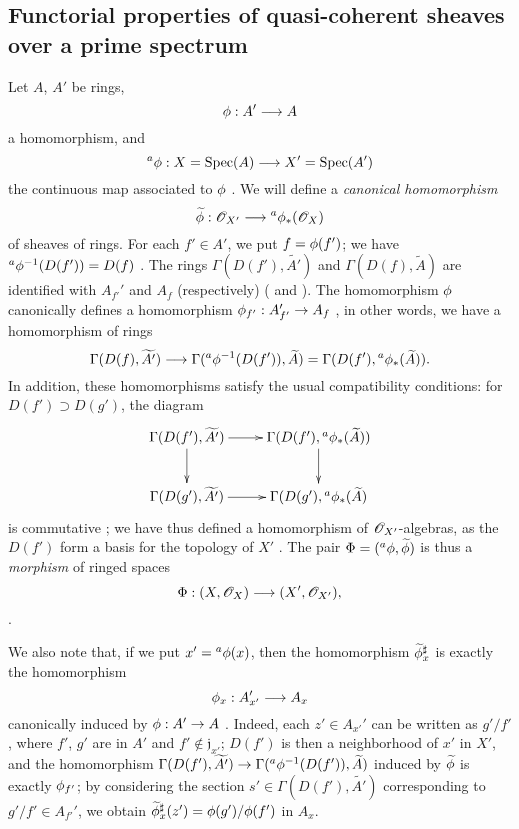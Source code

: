 \subsection{Functorial properties of quasi-coherent sheaves over a prime spectrum}
\label{subsection:I.1.6}

\begin{env}[1.6.1]
\label{I.1.6.1}
Let $A$, $A'$ be rings,
\[
  \vphi:A'\to A
\]
a homomorphism, and
\[
  {}^a\vphi:X=\Spec(A)\to X'=\Spec(A')
\]
the continuous map associated to $\phi$ .
We will define a \emph{canonical homomorphism}
\[
  \widetilde{\vphi}:\sh{O}_{X'}\to{}^a\vphi_*(\sh{O}_X)
\]
of sheaves of rings.
For each $f'\in A'$, we put $f=\phi(f')$;
we have ${}^a\phi^{-1}(D(f'))=D(f)$ .
The rings $\Gamma(D(f'),\widetilde{A'})$ and $\Gamma(D(f),\widetilde{A})$ are identified  with $A_{f'}'$ and $A_f$ (respectively) ( and ). The homomorphism $\phi$ canonically defines a homomorphism $\vphi_{f'}:A_{f'}'\to A_f$ , in other words, we have a homomorphism of rings
\[
  \Gamma(D(f),\widetilde{A'})\to\Gamma({}^a\vphi^{-1}(D(f')),\widetilde{A})
  =\Gamma(D(f'),{}^a\vphi_*(\widetilde{A})).
\]
In addition, these homomorphisms satisfy the usual compatibility conditions: for $D(f')\supset D(g')$, the diagram
\[
  \xymatrix{
    \Gamma(D(f'),\widetilde{A'})\ar[r]\ar[d] &
    \Gamma(D(f'),{}^a\vphi_*(\widetilde{A}))\ar[d]\\
    \Gamma(D(g'),\widetilde{A'})\ar[r] &
    \Gamma(D(g'),{}^a\vphi_*(\widetilde{A})
  }
\]
is commutative ;
we have thus defined a homomorphism of $\mathscr{O}_{X'}$-algebras, as the $D(f')$ form a basis for the topology of $X'$ .
The pair $\Phi=({}^a\phi,\widetilde{\phi})$ is thus a \emph{morphism} of ringed spaces
\[
  \Phi:(X,\sh{O}_X)\to(X',\sh{O}_{X'}),
\]
.

We also note that, if we put $x'={}^a\phi(x)$, then the homomorphism $\widetilde{\phi}_x^\sharp$  is exactly the homomorphism
\[
  \vphi_x:A_{x'}'\to A_x
\]
canonically induced by $\vphi:A'\to A$ .
Indeed, each $z'\in A_{x'}'$ can be written as $g'/f'$, where $f'$, $g'$ are in $A'$ and $f'\not\in\mathfrak{j}_{x'}$;
$D(f')$ is then a neighborhood of $x'$ in $X'$, and the homomorphism $\Gamma(D(f'),\widetilde{A'})\to\Gamma({}^a\vphi^{-1}(D(f')),\widetilde{A})$ induced by $\widetilde{\phi}$ is exactly $\phi_{f'}$;
by considering the section $s'\in\Gamma(D(f'),\widetilde{A'})$ corresponding to $g'/f'\in A_{f'}'$, we obtain $\widetilde{\phi}_x^\sharp(z')=\phi(g')/\phi(f')$ in $A_x$.
\end{env}

